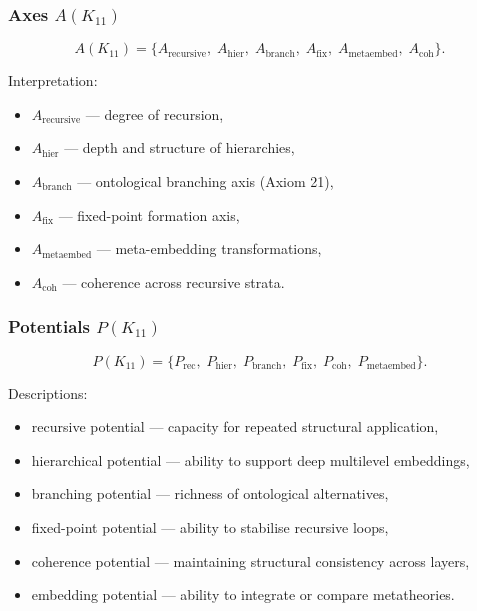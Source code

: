 \subsubsection{Axes $A(K_{11})$}

\[
A(K_{11}) =
\{
A_{\mathrm{recursive}},\;
A_{\mathrm{hier}},\;
A_{\mathrm{branch}},\;
A_{\mathrm{fix}},\;
A_{\mathrm{metaembed}},\;
A_{\mathrm{coh}}
\}.
\]

Interpretation:
\begin{itemize}
    \item $A_{\mathrm{recursive}}$ — degree of recursion,
    \item $A_{\mathrm{hier}}$ — depth and structure of hierarchies,
    \item $A_{\mathrm{branch}}$ — ontological branching axis (Axiom 21),
    \item $A_{\mathrm{fix}}$ — fixed-point formation axis,
    \item $A_{\mathrm{metaembed}}$ — meta-embedding transformations,
    \item $A_{\mathrm{coh}}$ — coherence across recursive strata.
\end{itemize}

\subsubsection{Potentials $P(K_{11})$}

\[
P(K_{11})=
\{
P_{\mathrm{rec}},\;
P_{\mathrm{hier}},\;
P_{\mathrm{branch}},\;
P_{\mathrm{fix}},\;
P_{\mathrm{coh}},\;
P_{\mathrm{metaembed}}
\}.
\]

Descriptions:
\begin{itemize}
    \item recursive potential — capacity for repeated structural application,
    \item hierarchical potential — ability to support deep multilevel embeddings,
    \item branching potential — richness of ontological alternatives,
    \item fixed-point potential — ability to stabilise recursive loops,
    \item coherence potential — maintaining structural consistency across layers,
    \item embedding potential — ability to integrate or compare metatheories.
\end{itemize}

